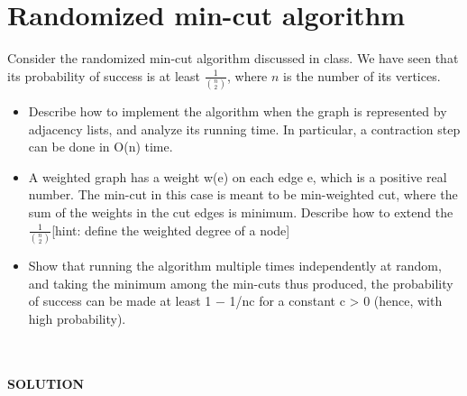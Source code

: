 \documentclass[a4paper]{article}
\begin{document}
\section*{Randomized min-cut algorithm}
Consider the randomized min-cut algorithm discussed
in class. We have seen that its probability of success is at least $\frac{1}{\binom{n}{2}}$, where $n$ is the number of its vertices.
\begin{itemize}
\item Describe how to implement the algorithm when the graph is represented by adjacency
lists, and analyze its running time. In particular, a contraction step can
be done in O(n) time.
\item A weighted graph has a weight w(e) on each edge e, which is a positive real
number. The min-cut in this case is meant to be min-weighted cut, where the
sum of the weights in the cut edges is minimum. Describe how to extend the $\frac{1}{\binom{n}{2}}$[hint: define the weighted degree of a node]
\item Show that running the algorithm multiple times independently at random, and
taking the minimum among the min-cuts thus produced, the probability of success
can be made at least 1 − 1/nc
for a constant c > 0 (hence, with high probability).
\end{itemize}
\qquad
\\
\\
\textbf{SOLUTION}
\\
\\
\end{document}
